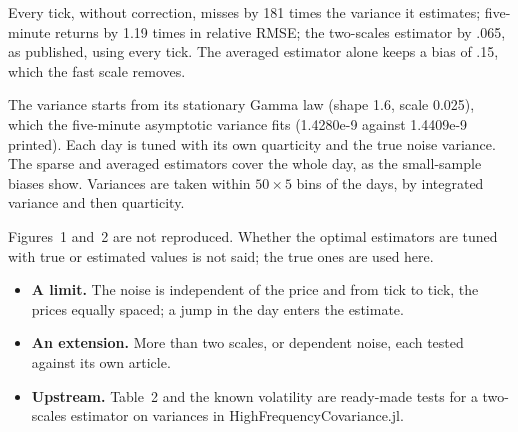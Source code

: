 Every tick, without correction, misses by 181 times the variance it estimates; five-minute returns by 1.19 times in
relative RMSE; the two-scales estimator by .065, as published, using every tick. The averaged estimator alone keeps a
bias of .15, which the fast scale removes.

The variance starts from its stationary Gamma law (shape 1.6, scale 0.025), which the five-minute asymptotic variance
fits (1.4280e-9 against 1.4409e-9 printed). Each day is tuned with its own quarticity and the true noise variance. The
sparse and averaged estimators cover the whole day, as the small-sample biases show. Variances are taken within
$50\times5$ bins of the days, by integrated variance and then quarticity.

Figures~1 and~2 are not reproduced. Whether the optimal estimators are tuned with true or estimated values is not said;
the true ones are used here.

\begin{itemize}
  \item \textbf{A limit.} The noise is independent of the price and from tick to tick, the prices equally spaced; a
    jump in the day enters the estimate.
  \item \textbf{An extension.} More than two scales, or dependent noise, each tested against its own article.
  \item \textbf{Upstream.} Table~2 and the known volatility are ready-made tests for a two-scales estimator on variances
    in HighFrequencyCovariance.jl.
\end{itemize}

{\footnotesize
{}
}

\nmcredit

